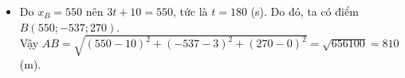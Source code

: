 \begin{bt}
{\begin{itemize}
			Do hai véc-tơ $\overrightarrow{AM}$ và $\overrightarrow{u}$ là cùng hướng nên $\overrightarrow{AM}=k\overrightarrow{u}$ với $k\in\mathbb{R}^+$.\\
			Suy ra $\left|\overrightarrow{AM}\right|=k\left|\overrightarrow{u}\right|=k\cdot\sqrt{2^2+(-2)^2+1^2}=3k$. Do đó $3k=4{,}5t\Leftrightarrow k=\dfrac{3t}{2}$. \\
			Vì thế, ta có $\overrightarrow{AM}=\dfrac{3t}{2}\overrightarrow{u}=\left(3t;-3t;\dfrac{3t}{2}\right)$.\\
			Gọi tọa độ của điểm $M$ là $(x_M;y_M;z_M)$.\\
			Do $\overrightarrow{AM}=(x_M-x_A;y_M-y_A;z_M-z_A)=\left(3t;-3t;\dfrac{3t}{2}\right)$ nên $$\heva{&x_M=3t+x_A\\&y_M=-3t+y_A\\&z_M=\dfrac{3t}{2}+z_A}\Leftrightarrow\heva{&x_M=3t+10\\&y_M=-3t+3\\&z_M=\dfrac{3t}{2}.}$$
			Vậy điểm $M$ có tọa độ là $\left(3t+10;-3t+3;\dfrac{3t}{2}\right)$.
			\item Do $x_B=550$ nên $3t+10=550$, tức là $t=180$ (s). Do đó, ta có điểm $B(550;-537;270)$.\\
			Vậy $AB=\sqrt{(550-10)^2+(-537-3)^2+(270-0)^2}=\sqrt{656100}=810$ (m).
		\end{itemize}
	}
\end{bt}

